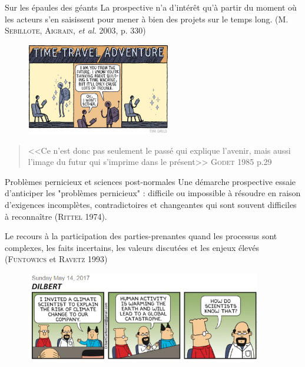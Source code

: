 \documentclass[newPxFont]{beamer}
\begin{document}
\begin{frame}[c]{Sur les épaules des géants}
  \vspace{-2em}
  La prospective n'a d'intérêt qu'à partir du moment où les acteurs s'en saisissent pour mener à bien des projets sur le temps long. (\textsc{M. Sebillote, Aigrain}, \textit{et al.} 2003, p. 330)
  \begin{figure}
   \includegraphics[height=4cm]{img/a_thom_gauld_futureMachine.jpg}
  \end{figure}
  \begin{quote}
    <<Ce n'est donc pas seulement le passé qui explique l'avenir, mais aussi l'image du futur qui s'imprime dans le présent>>
    \hspace*{\fill}\textsc{Godet} 1985 p.29
  \end{quote}
\end{frame}

\begin{frame}[c]{Problèmes pernicieux et sciences post-normales}
  \vspace{-2em}
  Une démarche prospective essaie d'anticiper les "problèmes pernicieux" :  difficile ou impossible à résoudre en raison d'exigences incomplètes, contradictoires et changeantes qui sont souvent difficiles à reconnaître (\textsc{Rittel} 1974).

  Le recours à la participation des parties-prenantes quand les processus sont complexes, les faits incertains, les valeurs discutées et les enjeux élevés (\textsc{Funtowics} et \textsc{Ravetz} 1993)

  \begin{figure}
   \includegraphics[height=4cm]{img/a_dilbert-climate-science.png}
  \end{figure}
\end{frame}
\end{document}
